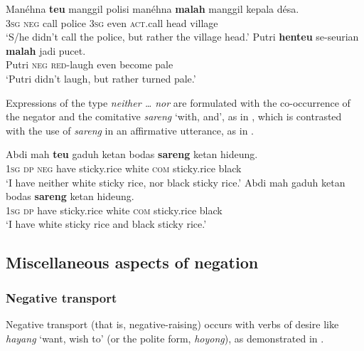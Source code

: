 \documentclass[output=paper]{langscibook}
\begin{document}
\ea\label{ex:sun:59}
    \ea\label{ex:sun:59a}
        \gll  Manéhna \textbf{teu} manggil polisi manéhna \textbf{malah} manggil kepala désa.\\ 
              3\textsc{sg} \textsc{neg} call police 3\textsc{sg} even \textsc{act}.call head village\\
        \glt ‘S/he didn’t call the police, but rather the village head.’
    \ex\label{ex:sun:59b}
        \gll  Putri \textbf{henteu} se-seurian \textbf{malah} jadi pucet. \\
              Putri \textsc{neg} \textsc{red}{}-laugh even become pale\\
        \glt ‘Putri didn’t laugh, but rather turned pale.’
    \z
\z 


 Expressions of the type \textit{neither … nor} are formulated with the co-occurrence of the negator and the comitative \textit{sareng} ‘with, and’, as in , which is contrasted with the use of \textit{sareng} in an affirmative utterance, as in . 

\ea\label{ex:sun:60}
    \ea\label{ex:sun:60a}
        \gll  Abdi mah \textbf{teu} gaduh ketan bodas \textbf{sareng} ketan hideung.\\ 
              1\textsc{sg} \textsc{dp} \textsc{neg} have sticky.rice white \textsc{com} sticky.rice black\\
        \glt ‘I have neither white sticky rice, nor black sticky rice.’
    \ex\label{ex:sun:60b}
        \gll  Abdi mah gaduh ketan bodas \textbf{sareng} ketan hideung.\\
              1\textsc{sg} \textsc{dp} have sticky.rice white \textsc{com} sticky.rice black\\
        \glt ‘I have white sticky rice and black sticky rice.’
    \z
\z 

\subsection{Miscellaneous aspects of negation}\label{sec:sun:4.6}

\subsubsection{Negative transport}\label{sec:sun:4.6.1}

Negative transport (that is, negative-raising) occurs with verbs of desire like \textit{hayang} ‘want, wish to’ (or the polite form, \textit{hoyong}), as demonstrated in . 
\end{document}
